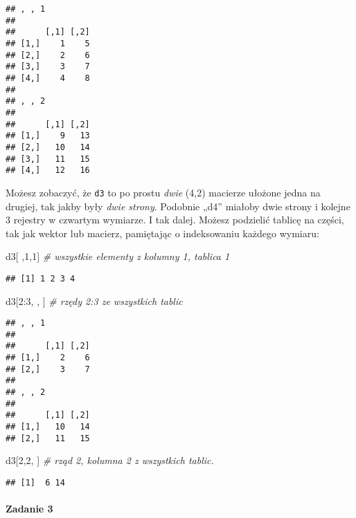 \documentclass[
]{article}
\newenvironment{Shaded}{\begin{snugshade}}{\end{snugshade}}
\newcommand{\CommentTok}[1]{\textcolor[rgb]{0.56,0.35,0.01}{\textit{#1}}}
\newcommand{\DecValTok}[1]{\textcolor[rgb]{0.00,0.00,0.81}{#1}}
\newcommand{\NormalTok}[1]{#1}
\newcommand{\SpecialCharTok}[1]{\textcolor[rgb]{0.00,0.00,0.00}{#1}}
\begin{document}
\begin{verbatim}
## , , 1
## 
##      [,1] [,2]
## [1,]    1    5
## [2,]    2    6
## [3,]    3    7
## [4,]    4    8
## 
## , , 2
## 
##      [,1] [,2]
## [1,]    9   13
## [2,]   10   14
## [3,]   11   15
## [4,]   12   16
\end{verbatim}

Możesz zobaczyć, że \texttt{d3} to po prostu \emph{dwie} (4,2) macierze
ułożone jedna na drugiej, tak jakby były \emph{dwie strony}. Podobnie
„d4'' miałoby dwie strony i kolejne 3 rejestry w czwartym wymiarze. I
tak dalej. Możesz podzielić tablicę na części, tak jak wektor lub
macierz, pamiętając o indeksowaniu każdego wymiaru:

\begin{Shaded}
\begin{Highlighting}[]
\NormalTok{d3[ ,}\DecValTok{1}\NormalTok{,}\DecValTok{1}\NormalTok{]  }\CommentTok{\# wszystkie elementy z kolumny 1, tablica 1}
\end{Highlighting}
\end{Shaded}

\begin{verbatim}
## [1] 1 2 3 4
\end{verbatim}

\begin{Shaded}
\begin{Highlighting}[]
\NormalTok{d3[}\DecValTok{2}\SpecialCharTok{:}\DecValTok{3}\NormalTok{, , ]  }\CommentTok{\# rzędy 2:3 ze wszystkich tablic}
\end{Highlighting}
\end{Shaded}

\begin{verbatim}
## , , 1
## 
##      [,1] [,2]
## [1,]    2    6
## [2,]    3    7
## 
## , , 2
## 
##      [,1] [,2]
## [1,]   10   14
## [2,]   11   15
\end{verbatim}

\begin{Shaded}
\begin{Highlighting}[]
\NormalTok{d3[}\DecValTok{2}\NormalTok{,}\DecValTok{2}\NormalTok{, ]  }\CommentTok{\# rząd 2, kolumna 2 z wszystkich tablic.}
\end{Highlighting}
\end{Shaded}

\begin{verbatim}
## [1]  6 14
\end{verbatim}

\hypertarget{zadanie-3}{%
\paragraph{Zadanie 3}\label{zadanie-3}}
\end{document}
